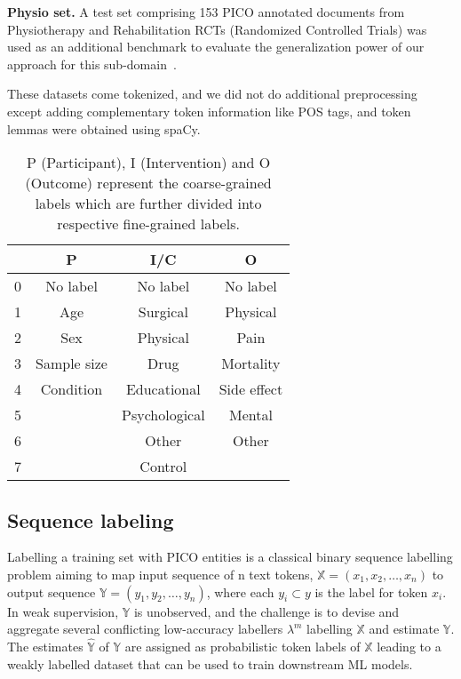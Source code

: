 \documentclass[10.7pt,]{article}
\begin{document}
\textbf{Physio set.} A test set comprising 153 PICO annotated documents from Physiotherapy and Rehabilitation RCTs (Randomized Controlled Trials) was used as an additional benchmark to evaluate the generalization power of our approach for this sub-domain~\cite{dhrangadhariya2021end}.

These datasets come tokenized, and we did not do additional preprocessing except adding complementary token information like POS tags, and token lemmas were obtained using spaCy.
%
%
%
\begin{table}[h!]
\begin{center}
\begin{tabular}{| c | c | c | c |} 
\hline
 & P & I/C & O \\ 
\hline
0 & No label & No label & No label \\ 
1 & Age & Surgical & Physical \\ 
2 & Sex & Physical & Pain \\
3 & Sample size & Drug & Mortality \\
4 & Condition & Educational & Side effect \\
5 &  & Psychological & Mental \\
6 &  & Other & Other \\
7 &  & Control &  \\
\hline
\end{tabular}
\caption{\label{table:coarsefineconcept} P (Participant), I (Intervention) and O (Outcome) represent the coarse-grained labels which are further divided into respective fine-grained labels.}
\end{center}
\end{table}
%
%
%
\subsection{Sequence labeling}\label{seq_lab}
%
Labelling a training set with PICO entities is a classical binary sequence labelling problem aiming to map input sequence of n text tokens, $ \mathbb{X} = (x_{1}, x_{2}, \dotso , x_{n} )$ to output sequence $\mathbb{Y} = (y_{1}, y_{2}, \dotso , y_{n} )$, where each $y_{i} \subset y$ is the label for token $x_{i}$.
In weak supervision, $\mathbb{Y}$ is unobserved, and the challenge is to devise and aggregate several conflicting low-accuracy labellers $\lambda^{m}$ labelling $\mathbb{X}$ and estimate $\mathbb{Y}$.
The estimates $\mathbb{\hat{Y}}$ of $\mathbb{Y}$ are assigned as probabilistic token labels of $\mathbb{X}$ leading to a weakly labelled dataset that can be used to train downstream ML models.
\end{document}
